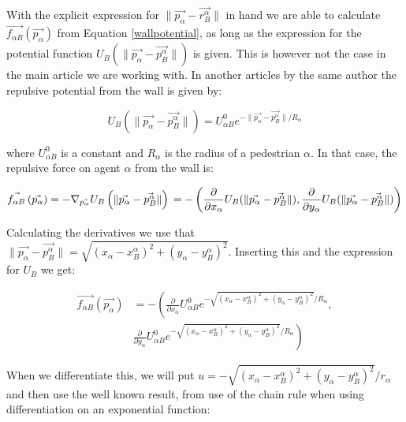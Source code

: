 With the explicit expression for $ \| \vec{p_{\alpha}} - \vec{r_{B}^{\alpha}} \| $ 
in hand we are able to calculate $\vec{f_{\alpha B}} \left( \vec{p_{\alpha}} \right)$ from 
Equation \ref{wallpotential}, as long as the expression for the potential function 
$U_{B}\left( \| \vec{p_{\alpha}} - \vec{p_{B}^{\alpha}} \| \right)$ is given. This is 
however not the case in the main article we are working with. In another articles \cite{ABconstant} by 
the same author the repulsive potential from the wall is given by: 

\begin{equation}
U_{B} \left( \| \vec{p_{\alpha}} - \vec{p_{B}^{\alpha}} \| \right) =
U^0_{\alpha B} e^{- \| \vec{p_{\alpha}} - \vec{p_{B}^{\alpha}} \| / R_{\alpha} }
\end{equation}

where $U^0_{\alpha B}$ is a constant and $R_{\alpha}$ is the radius of a pedestrian $\alpha$.
In that case, the repulsive force on agent $ \alpha $ from the wall is:

\begin{equation}
    \vec{f_{\alpha B}} \left( \vec{p_{\alpha}} \right) =
    - \nabla_{\vec{p_{\alpha}}} U_{B}
    \left( \| \vec{p_{\alpha}} - \vec{p_{B}^{\alpha}} \| \right)\\
=-\left( \frac{\partial}{\partial x_{\alpha}}U_{B}( \| \vec{p_{\alpha}} - \vec{p_{B}^{\alpha}} \|), \frac{\partial}{\partial y_{\alpha}}U_{B}( \| \vec{p_{\alpha}} - \vec{p_{B}^{\alpha}} \|)\right)
\end{equation}

Calculating the derivatives we use that
$\| \vec{p_{\alpha}} - \vec{p_{B}^{\alpha}} \|= \sqrt{(x_{\alpha}-x^{\alpha}_{B})^2+(y_{\alpha}-y^{\alpha}_B)^2}$.
Inserting this and the expression for $U_{B}$ we get:

\begin{equation}
\begin{split}
\vec{f_{\alpha B}} \left( \vec{p_{\alpha}} \right) 
& =-\left( \frac{\partial}{\partial x_{\alpha}}U^0_{\alpha B} e^{-\sqrt{(x_{\alpha}-x^{\alpha}_{B})^2+(y_{\alpha}-y^{\alpha}_B)^2}/R_{\alpha} }\right. , \\
& \left. \frac{\partial}{\partial y_{\alpha}}U^0_{\alpha B} e^{-\sqrt{(x_{\alpha}-x^{\alpha}_{B})^2+(y_{\alpha}-y^{\alpha}_B)^2}/R_{\alpha} } \right)
\end{split}
\end{equation}

When we differentiate this, we will put 
$u=-\sqrt{(x_{\alpha}-x^{\alpha}_{B})^2+(y_{\alpha}-y^{\alpha}_B)^2} / r_{\alpha}$ 
and then use the well known result, from use of the chain rule when using differentiation 
on an exponential function:


